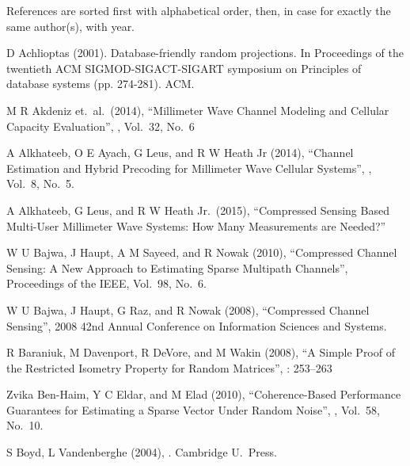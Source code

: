 \starttitle [title={References}]

References are sorted first with alphabetical order, then, in case for exactly the same author(s), with year.

\startitemize[n]

\item D Achlioptas (2001). Database-friendly random projections. In Proceedings of the twentieth ACM SIGMOD-SIGACT-SIGART symposium on Principles of database systems (pp. 274-281). ACM.

\item M R Akdeniz et.\ al.\ (2014), ``Millimeter Wave Channel Modeling and Cellular Capacity Evaluation'', , Vol.\ 32, No.\ 6

\item A Alkhateeb, O E Ayach, G Leus, and R W Heath Jr (2014), ``Channel Estimation and Hybrid Precoding for Millimeter Wave Cellular Systems'', , Vol.\ 8, No.\ 5.

\item A Alkhateeb, G Leus, and R W Heath Jr.\ (2015), ``Compressed Sensing Based Multi-User Millimeter Wave Systems: How Many Measurements are Needed?'' 

\item W U Bajwa, J Haupt, A M Sayeed, and R Nowak (2010), ``Compressed Channel Sensing: A New Approach to Estimating Sparse Multipath Channels'', Proceedings of the IEEE, Vol.\ 98, No.\ 6.

\item W U Bajwa, J Haupt, G Raz, and R Nowak (2008), ``Compressed Channel Sensing'', 2008 42nd Annual Conference on Information Sciences and Systems.

\item R Baraniuk, M Davenport, R DeVore, and M Wakin (2008), ``A Simple Proof of the Restricted Isometry Property for Random Matrices'',  : 253–263

\item Zvika Ben-Haim, Y C Eldar, and M Elad (2010), ``Coherence-Based Performance Guarantees for Estimating a Sparse Vector Under Random Noise'', , Vol.\ 58, No.\ 10.

\item S Boyd, L Vandenberghe (2004), . Cambridge U.\ Press.

